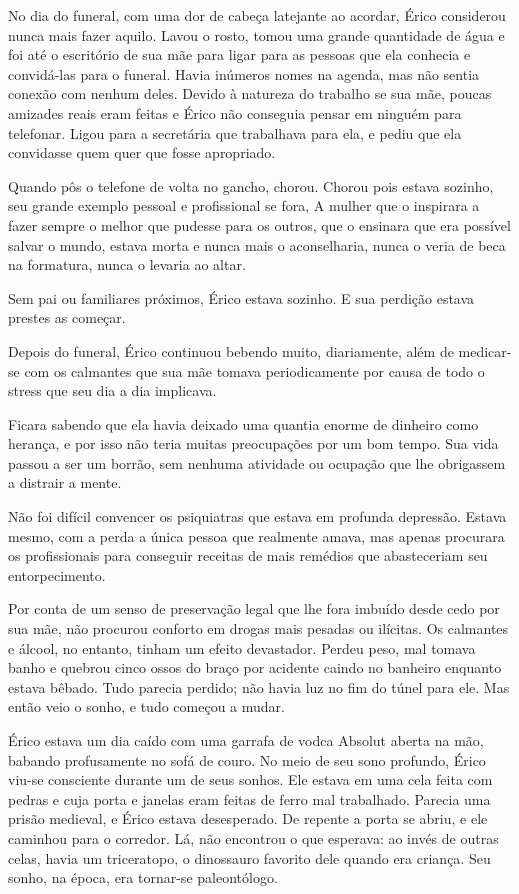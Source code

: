 No dia do funeral, com uma dor de cabeça latejante ao acordar, Érico
considerou nunca mais fazer aquilo. Lavou o rosto, tomou uma grande
quantidade de água e foi até o escritório de sua mãe para ligar para as
pessoas que ela conhecia e convidá-las para o funeral. Havia inúmeros
nomes na agenda, mas não sentia conexão com nenhum deles. Devido à
natureza do trabalho se sua mãe, poucas amizades reais eram feitas e
Érico não conseguia pensar em ninguém para telefonar. Ligou para a
secretária que trabalhava para ela, e pediu que ela convidasse quem quer
que fosse apropriado.

Quando pôs o telefone de volta no gancho, chorou. Chorou pois estava
sozinho, seu grande exemplo pessoal e profissional se fora, A mulher que
o inspirara a fazer sempre o melhor que pudesse para os outros, que o
ensinara que era possível salvar o mundo, estava morta e nunca mais o
aconselharia, nunca o veria de beca na formatura, nunca o levaria ao
altar.

Sem pai ou familiares próximos, Érico estava sozinho. E sua perdição
estava prestes as começar.

\espaco

Depois do funeral, Érico continuou bebendo muito, diariamente, além de
medicar-se com os calmantes que sua mãe tomava periodicamente por causa
de todo o stress que seu dia a dia implicava.

Ficara sabendo que ela havia deixado uma quantia enorme de dinheiro como
herança, e por isso não teria muitas preocupações por um bom tempo. Sua
vida passou a ser um borrão, sem nenhuma atividade ou ocupação que lhe
obrigassem a distrair a mente.

Não foi difícil convencer os psiquiatras que estava em profunda
depressão. Estava mesmo, com a perda a única pessoa que realmente amava,
mas apenas procurara os profissionais para conseguir receitas de mais
remédios que abasteceriam seu entorpecimento.

Por conta de um senso de preservação legal que lhe fora imbuído desde
cedo por sua mãe, não procurou conforto em drogas mais pesadas ou
ilícitas. Os calmantes e álcool, no entanto, tinham um efeito
devastador. Perdeu peso, mal tomava banho e quebrou cinco ossos do braço
por acidente caindo no banheiro enquanto estava bêbado. Tudo parecia
perdido; não havia luz no fim do túnel para ele. Mas então veio o sonho,
e tudo começou a mudar.

Érico estava um dia caído com uma garrafa de vodca Absolut aberta na
mão, babando profusamente no sofá de couro. No meio de seu sono
profundo, Érico viu-se consciente durante um de seus sonhos. Ele estava
em uma cela feita com pedras e cuja porta e janelas eram feitas de ferro
mal trabalhado. Parecia uma prisão medieval, e Érico estava desesperado.
De repente a porta se abriu, e ele caminhou para o corredor. Lá, não
encontrou o que esperava: ao invés de outras celas, havia um
triceratopo, o dinossauro favorito dele quando era criança. Seu sonho,
na época, era tornar-se paleontólogo.

